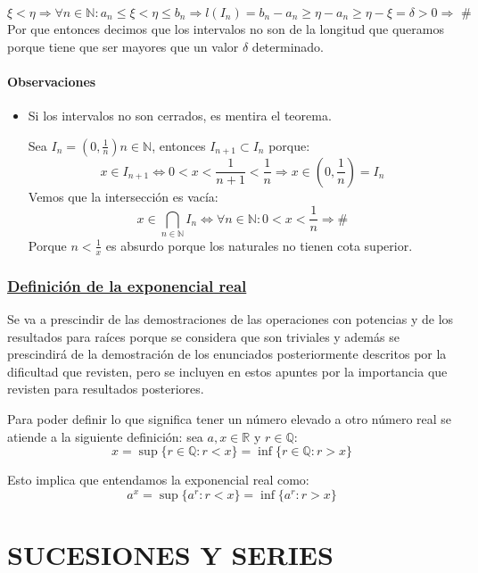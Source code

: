 \documentclass[10pt,a4paper,openright]{book}
\begin{document}
\begin{itemize}
$$\xi<\eta\Rightarrow \forall n \in \mathbb N: a_n\leq \xi<\eta\leq b_n\Rightarrow l(I_n)=b_n-a_n\geq \eta-a_n\geq \eta-\xi=\delta>0\Rightarrow \mbox{ \#}$$
Por que entonces decimos que los intervalos no son de la longitud que queramos porque tiene que ser mayores que un valor $\delta$ determinado.

\end{itemize}

\subsubsection*{Observaciones}
\begin{itemize}
\item Si los intervalos no son cerrados, es mentira el teorema.\par
Sea $I_n=\left(0,\frac{1}{n}\right) n\in \mathbb N$, entonces $I_{n+1}\subset I_n$ porque:
$$x\in I_{n+1}\Leftrightarrow 0<x<\frac{1}{n+1}<\frac{1}{n}\Rightarrow x\in \left(0,\frac{1}{n}\right)=I_n$$
Vemos que la intersección es vacía:
$$x\in \bigcap_{n\in \mathbb N}I_n\Leftrightarrow \forall n \in \mathbb N: 0<x<\frac{1}{n}\Rightarrow \#$$
Porque $n<\frac{1}{x}$ es absurdo porque los naturales no tienen cota superior.
\end{itemize}

\subsection*{\underline{Definición de la exponencial real}}
Se va a prescindir de las demostraciones de las operaciones con potencias y de los resultados para raíces porque se considera que son triviales y además se prescindirá de la demostración de los enunciados posteriormente descritos por la dificultad que revisten, pero se incluyen en estos apuntes por la importancia que revisten para resultados posteriores.

Para poder definir lo que significa tener un número elevado a otro número real se atiende a la siguiente definición: sea $a,x\in \mathbb R$ y $r\in \mathbb Q$:
$$x=\sup\{r\in \mathbb Q: r<x\}=\inf\{r\in \mathbb Q: r>x\}$$

Esto implica que entendamos la exponencial real como:
$$a^x=\sup\{a^r: r<x\}=\inf\{a^r: r>x\}$$

\chapter*{SUCESIONES Y SERIES}
\end{document}
